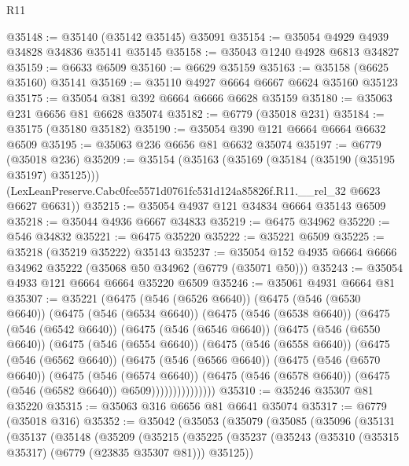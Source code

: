 \begin{lexlean}{R11}
\begin{coremodule}
@35148 := @35140 (@35142 @35145) @35091
@35154 := @35054 @4929 @4939 @34828 @34836 @35141 @35145
@35158 := @35043 @1240 @4928 @6813 @34827
@35159 := @6633 @6509
@35160 := @6629 @35159
@35163 := @35158 (@6625 @35160) @35141
@35169 := @35110 @4927 @6664 @6667 @6624 @35160 @35123
@35175 := @35054 @381 @392 @6664 @6666 @6628 @35159
@35180 := @35063 @231 @6656 @81 @6628 @35074
@35182 := @6779 (@35018 @231)
@35184 := @35175 (@35180 @35182)
@35190 := @35054 @390 @121 @6664 @6664 @6632 @6509
@35195 := @35063 @236 @6656 @81 @6632 @35074
@35197 := @6779 (@35018 @236)
@35209 := @35154
    (@35163
      (@35169 (@35184 (@35190 (@35195 @35197) @35125)))
      (LexLeanPreserve.Cabc0fce5571d0761fc531d124a85826f.R11.__rel_32 @6623 @6627 @6631))
@35215 := @35054 @4937 @121 @34834 @6664 @35143 @6509
@35218 := @35044 @4936 @6667 @34833
@35219 := @6475 @34962
@35220 := @546 @34832
@35221 := @6475 @35220
@35222 := @35221 @6509
@35225 := @35218 (@35219 @35222) @35143
@35237 := @35054 @152 @4935 @6664 @6666 @34962 @35222 (@35068 @50 @34962 (@6779 (@35071 @50)))
@35243 := @35054 @4933 @121 @6664 @6664 @35220 @6509
@35246 := @35061 @4931 @6664 @81
@35307 := @35221
    (@6475
      (@546 (@6526 @6640))
      (@6475
        (@546 (@6530 @6640))
        (@6475
          (@546 (@6534 @6640))
          (@6475
            (@546 (@6538 @6640))
            (@6475
              (@546 (@6542 @6640))
              (@6475
                (@546 (@6546 @6640))
                (@6475
                  (@546 (@6550 @6640))
                  (@6475
                    (@546 (@6554 @6640))
                    (@6475
                      (@546 (@6558 @6640))
                      (@6475
                        (@546 (@6562 @6640))
                        (@6475
                          (@546 (@6566 @6640))
                          (@6475
                            (@546 (@6570 @6640))
                            (@6475
                              (@546 (@6574 @6640))
                              (@6475
                                (@546 (@6578 @6640))
                                (@6475 (@546 (@6582 @6640)) @6509)))))))))))))))
@35310 := @35246 @35307 @81 @35220
@35315 := @35063 @316 @6656 @81 @6641 @35074
@35317 := @6779 (@35018 @316)
@35352 := @35042
    (@35053
      (@35079
        (@35085
          (@35096
            (@35131
              (@35137
                (@35148
                  (@35209
                    (@35215
                      (@35225
                        (@35237
                          (@35243 (@35310 (@35315 @35317) (@6779 (@23835 @35307 @81))) @35125))

\end{coremodule}
\end{lexlean}
